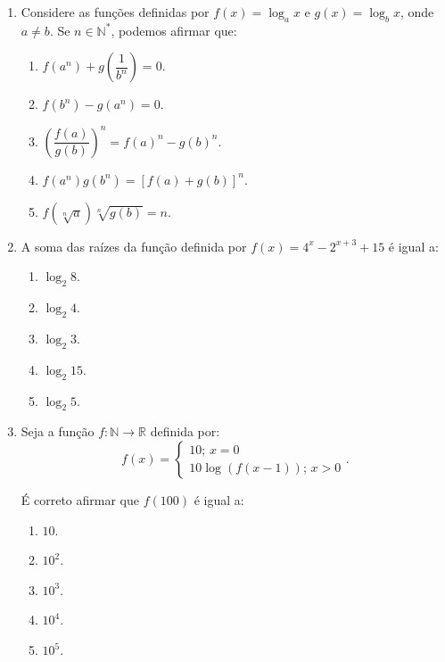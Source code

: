 \documentclass[12pt,a4paper]{article}
\begin{document}
\begin{enumerate}
  \item Considere as funções definidas por $f(x) = \log_a x$ e $g(x) = \log_b x$, onde $a\neq b$.
  Se $n\in\mathbb{N}^*$, podemos afirmar que:
    \begin{enumerate}
      \item $f\left(a^n\right) + g\left(\dfrac{1}{b^n}\right) = 0$. %
      \item $f\left(b^n\right) - g\left(a^n\right) = 0$.
      \item $\left(\dfrac{f(a)}{g(b)}\right)^n = f(a)^n - g(b)^n$.
      \item $f\left(a^n\right)g\left(b^n\right) = [f(a) + g(b)]^n$.
      \item $f\left(\sqrt[n]{a}\right)\sqrt[n]{g(b)} = n$.
    \end{enumerate}

  \item A soma das raízes da função definida por $f(x) = 4^x - 2^{x+3} + 15$ é igual a:
    \begin{enumerate}
      \item $\log_2 8$.
      \item $\log_2 4$.
      \item $\log_2 3$.
      \item $\log_2 15$. %
      \item $\log_2 5$.
    \end{enumerate}
    
  \item Seja a função $f:\mathbb{N}\to\mathbb{R}$ definida por:
  $$f(x)=\begin{cases}10;\, x=0 \\ 10\log (f(x-1));\,x>0 \end{cases}.$$

  É correto afirmar que $f(100)$ é igual a:

  \begin{enumerate}
    \item $10$. %
    \item $10^2$.
    \item $10^3$.
    \item $10^4$.
    \item $10^5$.
  \end{enumerate}
  

\end{enumerate}
\end{document}
